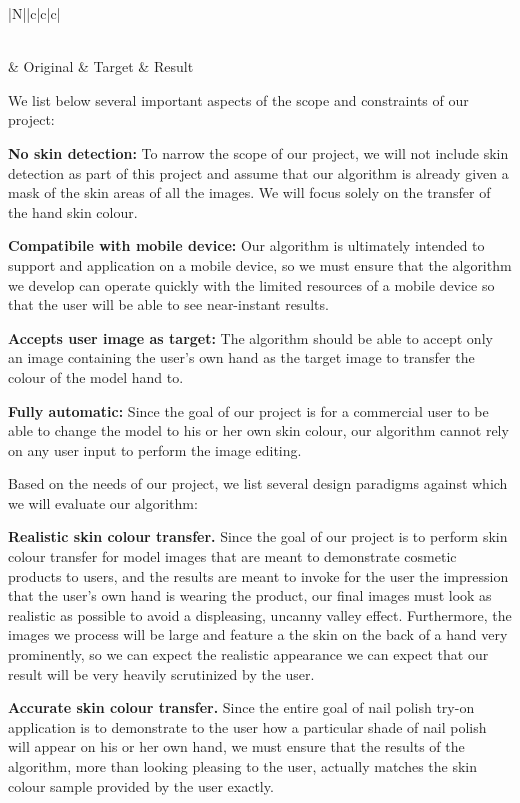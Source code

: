 \begin{longtable}{|N||c|c|c|}
	\caption{Example of our desired result \label{tab:our_demo}}\\
	\hline
	 & Original & Target & Result \\ 
	\hline
		
 \end{longtable}

We list below several important aspects of the scope and constraints of our project:

\textbf{No skin detection:} To narrow the scope of our project, we will not include skin detection as part of this project and assume that our algorithm is already given a mask of the skin areas of all the images. We will focus solely on the transfer of the hand skin colour. 

\textbf{Compatibile with mobile device:} Our algorithm is ultimately intended to support and application on a mobile device, so we must ensure that the algorithm we develop can operate quickly with the limited resources of a mobile device so that the user will be able to see near-instant results.

\textbf{Accepts user image as target:} The algorithm should be able to accept only an image containing the user's own hand as the target image to transfer the colour of the model hand to.

\textbf{Fully automatic:} Since the goal of our project is for a commercial user to be able to change the model to his or her own skin colour, our algorithm cannot rely on any user input to perform the image editing.

Based on the needs of our project, we list several design paradigms against which we will evaluate our algorithm:

\textbf{Realistic skin colour transfer.}
Since the goal of our project is to perform skin colour transfer for model images that are meant to demonstrate cosmetic products to users, and the results are meant to invoke for the user the impression that the user's own hand is wearing the product, our final images must look as realistic as possible to avoid a displeasing, uncanny valley effect. Furthermore, the images we process will be large and feature a the skin on the back of a hand very prominently, so we can expect the realistic appearance we can expect that our result will be very heavily scrutinized by the user.

\textbf{Accurate skin colour transfer.} 
Since the entire goal of nail polish try-on application is to demonstrate to the user how a particular shade of nail polish will appear on his or her own hand, we must ensure that the results of the algorithm, more than looking pleasing to the user, actually matches the skin colour sample provided by the user exactly.

